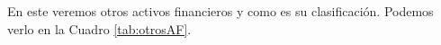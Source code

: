 En este veremos otros activos financieros y como es su clasificación. Podemos verlo en la Cuadro \ref{tab:otrosAF}.



